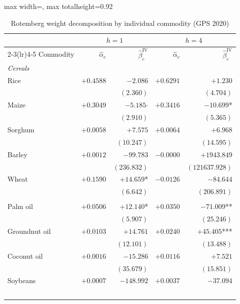 
\begin{table}[htbp]
\centering
\caption{Rotemberg weight decomposition by individual commodity (GPS 2020)}
\label{tab:rotemberg-commodity}
\begin{adjustbox}{max width=\textwidth, max totalheight=0.92\textheight}
\begin{threeparttable}\small
\begin{tabular}{l rr@{\quad}rr}
\toprule
 & \multicolumn{2}{c}{$h=1$} & \multicolumn{2}{c}{$h=4$} \\
\cmidrule(lr){2-3}\cmidrule(lr){4-5}
Commodity & $\hat{\alpha}_c$ & $\hat{\beta}_c^{\text{IV}}$ & $\hat{\alpha}_c$ & $\hat{\beta}_c^{\text{IV}}$ \\
\midrule
\multicolumn{5}{l}{\textit{Cereals}} \\
\midrule
\quad Rice & $+0.4588$ & $-2.086$ & $+0.6291$ & $+1.230$ \\
   & & $(2.360)$ & & $(4.704)$ \\[2pt]
\quad Maize & $+0.3049$ & $-5.185$$\cdot$ & $+0.3416$ & $-10.699$* \\
   & & $(2.910)$ & & $(5.365)$ \\[2pt]
\quad Sorghum & $+0.0058$ & $+7.575$ & $+0.0064$ & $+6.968$ \\
   & & $(10.247)$ & & $(14.595)$ \\[2pt]
\quad Barley & $+0.0012$ & $-99.783$ & $-0.0000$ & $+1943.849$ \\
   & & $(236.832)$ & & $(121637.928)$ \\[2pt]
\quad Wheat & $+0.1590$ & $+14.659$* & $-0.0126$ & $-84.644$ \\
   & & $(6.642)$ & & $(206.891)$ \\[2pt]
\addlinespace
\multicolumn{5}{l}{\textit{Oils}} \\
\midrule
\quad Palm oil & $+0.0506$ & $+12.140$* & $+0.0350$ & $-71.009$** \\
   & & $(5.907)$ & & $(25.246)$ \\[2pt]
\quad Groundnut oil & $+0.0103$ & $+14.761$ & $+0.0240$ & $+45.405$*** \\
   & & $(12.101)$ & & $(13.488)$ \\[2pt]
\quad Coconut oil & $+0.0016$ & $-15.286$ & $+0.0116$ & $+7.521$ \\
   & & $(35.679)$ & & $(15.851)$ \\[2pt]
\quad Soybeans & $+0.0007$ & $-148.992$ & $+0.0037$ & $-37.094$ \\
$$
\end{tabular}
\end{threeparttable}
\end{adjustbox}
\end{table}
